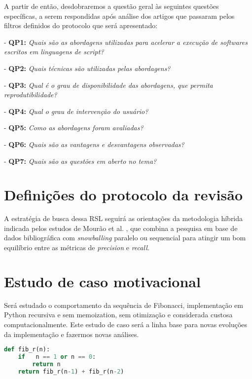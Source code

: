 \documentclass[sigconf]{acmart}
\begin{document}
A partir de então, desdobraremos a questão geral às seguintes questões específicas, a serem respondidas após análise dos artigos que passaram pelos filtros definidos do protocolo que será apresentado:  

- \textbf{QP1:} {\textit{Quais são as abordagens utilizadas para acelerar a execução de softwares escritos em linguagens de script?}}

- \textbf{QP2:} {\textit{Quais técnicas são utilizadas pelas abordagens?}}

- \textbf{QP3:} {\textit{Qual é o grau de disponibilidade das abordagens, que permita reprodutibilidade?}}

- \textbf{QP4:} {\textit{Qual o grau de intervenção do usuário?}}

- \textbf{QP5:} {\textit{Como as abordagens foram avaliadas?}}

- \textbf{QP6:} {\textit{Quais são as vantagens e desvantagens observadas?}}

- \textbf{QP7:} {\textit{Quais são as questões em aberto no tema?}}


\section{Definições do protocolo da revisão}
A estratégia de busca dessa RSL seguirá as orientações da metodologia híbrida indicada pelos estudos de Mourão et al. \cite{mourao2020performance}, que combina a pesquisa em base de dados bibliográfica com \textit{snowballing} paralelo ou sequencial para atingir um bom equilíbrio entre as métricas de \textit{precision} e \textit{recall}.





\section{Estudo de caso motivacional}
Será estudado o comportamento da sequência de Fibonacci, implementação em Python recursiva e sem memoization, sem otimização e considerada custosa computacionalmente. Este estudo de caso será a linha base para novas evoluções da implementação e fazermos novas análises. 
\renewcommand{\lstlistingname}{Código}
\begin{lstlisting}[language=Python, caption=Fibonacci recursivo sem memoization]
def fib_r(n):
    if   n == 1 or n == 0:
        return n
    return fib_r(n-1) + fib_r(n-2)
\end{lstlisting}
\end{document}
